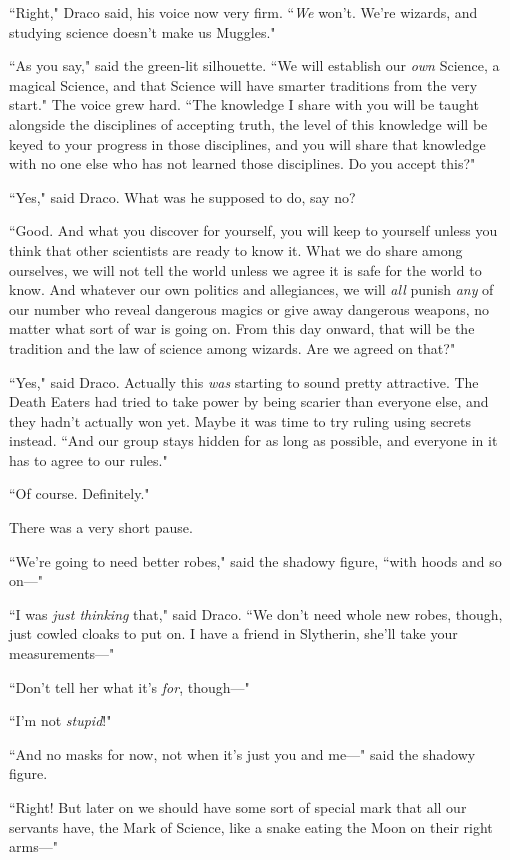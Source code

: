 ``Right," Draco said, his voice now very firm. ``\emph{We} won't. We're wizards, and studying science doesn't make us Muggles."

``As you say," said the green-lit silhouette. ``We will establish our \emph{own} Science, a magical Science, and that Science will have smarter traditions from the very start." The voice grew hard. ``The knowledge I share with you will be taught alongside the disciplines of accepting truth, the level of this knowledge will be keyed to your progress in those disciplines, and you will share that knowledge with no one else who has not learned those disciplines. Do you accept this?"

``Yes," said Draco. What was he supposed to do, say no?

``Good. And what you discover for yourself, you will keep to yourself unless you think that other scientists are ready to know it. What we do share among ourselves, we will not tell the world unless we agree it is safe for the world to know. And whatever our own politics and allegiances, we will \emph{all} punish \emph{any} of our number who reveal dangerous magics or give away dangerous weapons, no matter what sort of war is going on. From this day onward, that will be the tradition and the law of science among wizards. Are we agreed on that?"

``Yes," said Draco. Actually this \emph{was} starting to sound pretty attractive. The Death Eaters had tried to take power by being scarier than everyone else, and they hadn't actually won yet. Maybe it was time to try ruling using secrets instead. ``And our group stays hidden for as long as possible, and everyone in it has to agree to our rules."

``Of course. Definitely."

There was a very short pause.

``We're going to need better robes," said the shadowy figure, ``with hoods and so on---"

``I was \emph{just thinking} that," said Draco. ``We don't need whole new robes, though, just cowled cloaks to put on. I have a friend in Slytherin, she'll take your measurements---"

``Don't tell her what it's \emph{for}, though---"

``I'm not \emph{stupid}!"

``And no masks for now, not when it's just you and me---" said the shadowy figure.

``Right! But later on we should have some sort of special mark that all our servants have, the Mark of Science, like a snake eating the Moon on their right arms---"

